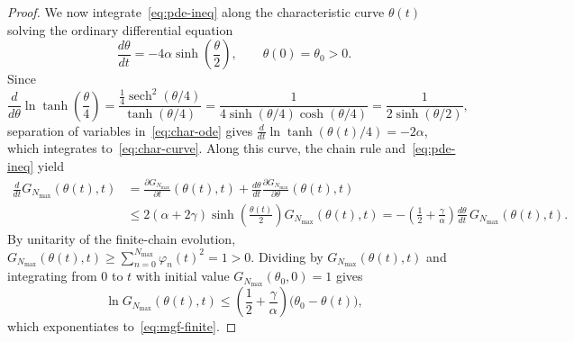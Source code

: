 \documentclass[11pt,a4paper]{article}
\numberwithin{equation}{section}
\theoremstyle{plain}
\theoremstyle{definition}
\newcommand{\sech}{\operatorname{sech}}
\begin{document}
\begin{proof}
We now integrate~\eqref{eq:pde-ineq} along the characteristic curve $\theta(t)$ solving the ordinary differential equation
\begin{equation}\label{eq:char-ode}
  \frac{d\theta}{dt} = -4\alpha\sinh\!\left(\frac{\theta}{2}\right), \qquad \theta(0) = \theta_0 > 0.
\end{equation}
Since
\[
  \frac{d}{d\theta}\ln\tanh\!\left(\frac{\theta}{4}\right)
  = \frac{\frac{1}{4}\sech^2(\theta/4)}{\tanh(\theta/4)}
  = \frac{1}{4\sinh(\theta/4)\cosh(\theta/4)}
  = \frac{1}{2\sinh(\theta/2)},
\]
separation of variables in~\eqref{eq:char-ode} gives $\frac{d}{dt}\ln\tanh(\theta(t)/4) = -2\alpha$, which integrates to~\eqref{eq:char-curve}. Along this curve, the chain rule and~\eqref{eq:pde-ineq} yield
\begin{align*}
  \frac{d}{dt} G_{N_{\max}}(\theta(t),t)
  &= \frac{\partial G_{N_{\max}}}{\partial t}(\theta(t),t) + \frac{d\theta}{dt}\frac{\partial G_{N_{\max}}}{\partial\theta}(\theta(t),t) \\
  &\le 2(\alpha+2\gamma)\sinh\!\left(\frac{\theta(t)}{2}\right)G_{N_{\max}}(\theta(t),t)
  = -\left(\frac{1}{2}+\frac{\gamma}{\alpha}\right)\frac{d\theta}{dt}\,G_{N_{\max}}(\theta(t),t).
\end{align*}
By unitarity of the finite-chain evolution, $G_{N_{\max}}(\theta(t),t) \ge \sum_{n=0}^{N_{\max}}\varphi_n(t)^2 = 1 > 0$. Dividing by $G_{N_{\max}}(\theta(t),t)$ and integrating from $0$ to $t$ with initial value $G_{N_{\max}}(\theta_0,0) = 1$ gives
\[
  \ln G_{N_{\max}}(\theta(t),t) \le \left(\frac{1}{2}+\frac{\gamma}{\alpha}\right)\bigl(\theta_0 - \theta(t)\bigr),
\]
which exponentiates to~\eqref{eq:mgf-finite}.
\end{proof}
\end{document}
